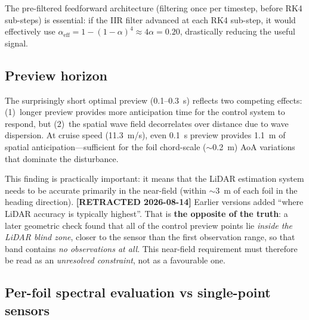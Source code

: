 \documentclass[review]{elsarticle}
\begin{document}
The pre-filtered feedforward architecture (filtering once per
timestep, before RK4 sub-steps) is essential: if the IIR filter
advanced at each RK4 sub-step, it would effectively use
$\alpha_\text{eff} = 1-(1-\alpha)^4 \approx 4\alpha = 0.20$,
drastically reducing the useful signal.

\subsection{Preview horizon}

The surprisingly short optimal preview (0.1--0.3~s) reflects two
competing effects: (1)~longer preview provides more anticipation
time for the control system to respond, but (2)~the spatial
wave field decorrelates over distance due to wave dispersion.
At cruise speed (11.3~m/s), even 0.1~s preview provides 1.1~m
of spatial anticipation---sufficient for the foil chord-scale
($\sim$0.2~m) AoA variations that dominate the disturbance.

This finding is practically important: it means that the LiDAR
estimation system needs to be accurate primarily in the near-field
(within $\sim$3~m of each foil in the heading direction).
\textbf{[RETRACTED 2026-08-14]} Earlier versions added ``where LiDAR accuracy
is typically highest''. That is \textbf{the opposite of the truth}: a later
geometric check found that all of the control preview points lie
\emph{inside the LiDAR blind zone}, closer to the sensor than the first
observation range, so that band contains \emph{no observations at all}.
This near-field requirement must therefore be read as an \emph{unresolved
constraint}, not as a favourable one.

\subsection{Per-foil spectral evaluation vs single-point sensors}
\label{sec:discuss_sp}
\end{document}
